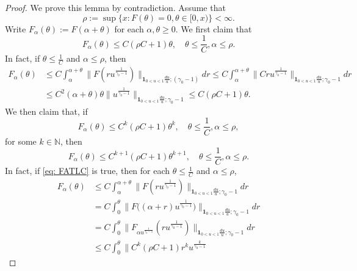 \documentclass[12pt, a4paper]{amsart}
\theoremstyle{definition}
\numberwithin{equation}{section}
\begin{document}
\begin{proof}
    We prove this lemma by contradiction.
	Assume that
\begin{equation}\label{eq: definition of rho}
	\rho :=  \sup\{x: F(\theta) = 0, \theta \in [0,x)\} < \infty.
\end{equation}
	Write $F_\alpha (\theta) := F(\alpha + \theta)$ for each $\alpha, \theta \geq 0$.
	We first claim that
\begin{equation}
	F_\alpha (\theta)
	\leq C(\rho C + 1) \theta,
	\quad \theta \leq \frac{1}{C}, \alpha \leq \rho.
\end{equation}
	In fact, if $\theta \leq \frac{1}{C}$ and $\alpha \leq \rho$, then
\begin{equation}\begin{split}
	F_\alpha (\theta)
	&\leq C\int_\alpha^{\alpha + \theta} \|F(ru^{\frac{1}{\gamma_0 - 1}}) \|_{\mathbf 1_{0<u<1}\frac{du}{u}; (\gamma_0 - 1)} dr
	\leq C\int_\alpha^{\alpha + \theta} \|Cru^{\frac{1}{\gamma_0 - 1}} \|_{\mathbf 1_{0<u<1}\frac{du}{u}; \gamma_0 - 1} dr
	\\&\leq C^2 (\alpha + \theta) \theta \|u^{\frac{1}{\gamma_0 - 1}} \|_{\mathbf 1_{0<u<1}\frac{du}{u}; \gamma_0 - 1}
	\leq C(\rho C + 1) \theta.
\end{split}\end{equation}
	We then claim that, if
\begin{equation}\label{eq: FATLC}
	F_\alpha (\theta)
	\leq C^k(\rho C + 1) \theta^k,
	\quad \theta \leq \frac{1}{C}, \alpha \leq \rho,
\end{equation}
	for some $k \in \mathbb N$, then
\begin{equation}
	F_\alpha (\theta)
	\leq C^{k+1}(\rho C + 1) \theta^{k+1},
	\quad \theta \leq \frac{1}{C}, \alpha \leq \rho.
	\end{equation}
	In fact, if \eqref{eq: FATLC} is true, then for each $\theta \leq \frac{1}{C}$ and $\alpha \leq \rho$,
\begin{equation}\begin{split}
	F_\alpha (\theta)
	&\leq C\int_\alpha^{\alpha + \theta} \|F(ru^{\frac{1}{\gamma_0 - 1}}) 
	\|_{\mathbf 1_{0<u<1}\frac{du}{u}; \gamma_0 - 1} dr\\
   &=  C\int_0^\theta \big \|F\big( (\alpha + r)u^{\frac{1}{\gamma_0 - 1}} \big )
	\big \|_{\mathbf 1_{0<u<1}\frac{du}{u}; \gamma_0 - 1} dr
	\\& =  C\int_0^\theta \|F_{\alpha u^{\frac{1}{\gamma_0 - 1}}}( ru^{\frac{1}{\gamma_0 - 1}}) \|_{\mathbf 1_{0<u<1}\frac{du}{u}; \gamma_0 - 1} dr
  \\&\leq C\int_0^ \theta \|C^k (\rho C+ 1) r^k u^{\frac{k}{\gamma_0 - 1} } 

\end{split}
\end{equation}
\end{proof}
\end{document}

